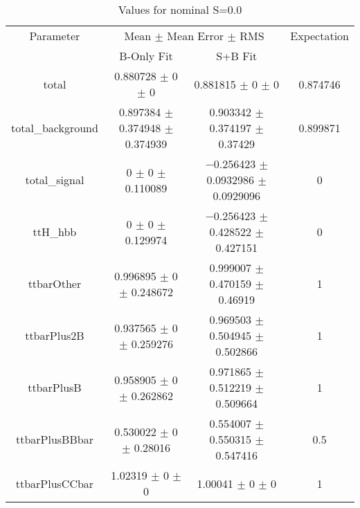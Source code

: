 \begin{table}
\centering
\caption{Values for nominal S=0.0}
\begin{tabular}{cccc}
\toprule
Parameter & \multicolumn{2}{c}{Mean $\pm$ Mean Error $\pm$ RMS} & Expectation\\
 & B-Only Fit & S+B Fit & \\
\midrule
total & \num{0.880728} $\pm$ \num{0} $\pm$ \num{0} & \num{0.881815} $\pm$ \num{0} $\pm$ \num{0} & \num{0.874746}\\
total\_background & \num{0.897384} $\pm$ \num{0.374948} $\pm$ \num{0.374939} & \num{0.903342} $\pm$ \num{0.374197} $\pm$ \num{0.37429} & \num{0.899871}\\
total\_signal & \num{0} $\pm$ \num{0} $\pm$ \num{0.110089} & \num{-0.256423} $\pm$ \num{0.0932986} $\pm$ \num{0.0929096} & \num{0}\\
ttH\_hbb & \num{0} $\pm$ \num{0} $\pm$ \num{0.129974} & \num{-0.256423} $\pm$ \num{0.428522} $\pm$ \num{0.427151} & \num{0}\\
ttbarOther & \num{0.996895} $\pm$ \num{0} $\pm$ \num{0.248672} & \num{0.999007} $\pm$ \num{0.470159} $\pm$ \num{0.46919} & \num{1}\\
ttbarPlus2B & \num{0.937565} $\pm$ \num{0} $\pm$ \num{0.259276} & \num{0.969503} $\pm$ \num{0.504945} $\pm$ \num{0.502866} & \num{1}\\
ttbarPlusB & \num{0.958905} $\pm$ \num{0} $\pm$ \num{0.262862} & \num{0.971865} $\pm$ \num{0.512219} $\pm$ \num{0.509664} & \num{1}\\
ttbarPlusBBbar & \num{0.530022} $\pm$ \num{0} $\pm$ \num{0.28016} & \num{0.554007} $\pm$ \num{0.550315} $\pm$ \num{0.547416} & \num{0.5}\\
ttbarPlusCCbar & \num{1.02319} $\pm$ \num{0} $\pm$ \num{0} & \num{1.00041} $\pm$ \num{0} $\pm$ \num{0} & \num{1}\\
\bottomrule
\end{tabular}
\end{table}